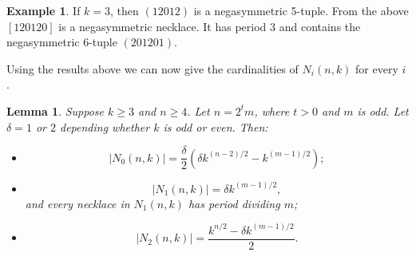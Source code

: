 \documentclass[a4paper,11pt]{article}
\theoremstyle{plain}
\newtheorem{lemma}{Lemma}[section]
\theoremstyle{definition}
\newtheorem{example}{Example}[section]
\theoremstyle{remark}
\begin{document}
\begin{example}
If $k=3$, then $(12012)$ is a negasymmetric 5-tuple.  From the above $[120120]$ is a negasymmetric
necklace. It has period 3 and contains the negasymmetric 6-tuple $(201201)$.
\end{example}


Using the results above we can now give the cardinalities of $N_i(n,k)$ for every $i$.




\begin{lemma}\label{lemma:secondformulae N0N1N2_rev}
Suppose $k\geq3$ and $n\geq4$.  Let $n=2^tm$, where $t>0$ and $m$ is odd.  Let $\delta=1$ or $2$
depending whether $k$ is odd or even. Then:
\begin{itemize}
\item[(i)]
 \[ |N_0(n,k)| =
  \frac{\delta}{2} (\delta k^{(n-2)/2}-k^{(m-1)/2}); \]
\item[(ii)] \[ |N_1(n,k)| = \delta k^{(m-1)/2},\] and every necklace in $N_1(n,k)$ has  period
    dividing $m$;
\item[(iii)] \[ |N_2(n,k)| = \frac{k^{n/2}-\delta k^{(m-1)/2}}{2}. \]
\end{itemize}
\end{lemma}
\end{document}
